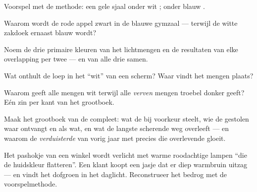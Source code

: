 \begin{exercise}[$\star$]\label{exo:g8:colors-spectra:5}
Voorspel met de methode: een gele sjaal onder wit ; onder
blauw .
\end{exercise}

\begin{exercise}[$\star$]\label{exo:g8:colors-spectra:6}
Waarom wordt de rode appel zwart in de blauwe gymzaal --- terwijl de
witte zakdoek ernaast blauw wordt?
\end{exercise}

\begin{exercise}[$\star$]\label{exo:g8:colors-spectra:7}
Noem de drie primaire kleuren van het lichtmengen en de resultaten van
elke overlapping per twee --- en van alle drie samen.
\end{exercise}

\begin{exercise}[$\star$]\label{exo:g8:colors-spectra:8}
Wat onthult de loep in het ``wit'' van een scherm? Waar vindt het
mengen plaats?
\end{exercise}

\begin{exercise}[$\star\star$]\label{exo:g8:colors-spectra:9}
Waarom geeft alle \emph{} mengen wit terwijl alle
\emph{verven} mengen troebel donker geeft? Eén zin per kant van het
grootboek.
\end{exercise}

\begin{exercise}[$\star\star$]\label{exo:g8:colors-spectra:10}
Maak het grootboek van de  compleet: wat de
 bij voorkeur steelt, wie de gestolen waar ontvangt en als
wat, en wat de langste scherende weg overleeft --- en waarom de
\emph{verduisterde } van vorig jaar met precies die
overlevende gloeit.
\end{exercise}

\begin{exercise}[$\star\star$]\label{exo:g8:colors-spectra:11}
Het pashokje van een winkel wordt verlicht met warme roodachtige lampen
``die de huidskleur flatteren''. Een klant koopt een jasje dat er diep
warmbruin uitzag --- en vindt het dofgroen in het daglicht.
Reconstrueer het bedrog met de voorspelmethode.
\end{exercise}

